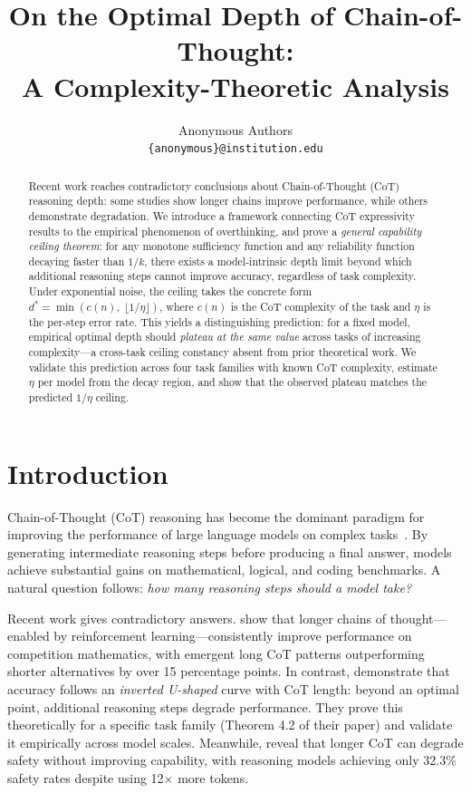 \documentclass{article}
\title{On the Optimal Depth of Chain-of-Thought:\\A Complexity-Theoretic Analysis}
\author{Anonymous Authors \\
  \texttt{\{anonymous\}@institution.edu}
}
\theoremstyle{definition}
\theoremstyle{remark}
\newcommand{\depth}{d^*}       %
\newcommand{\noise}{\eta}      %
\newcommand{\ccot}{c}          %
\begin{document}
\maketitle

\begin{abstract}
Recent work reaches contradictory conclusions about Chain-of-Thought (CoT) reasoning depth: some studies show longer chains improve performance, while others demonstrate degradation.
We introduce a framework connecting CoT expressivity results to the empirical phenomenon of overthinking, and prove a \emph{general capability ceiling theorem}: for any monotone sufficiency function and any reliability function decaying faster than $1/k$, there exists a model-intrinsic depth limit beyond which additional reasoning steps cannot improve accuracy, regardless of task complexity.
Under exponential noise, the ceiling takes the concrete form $\depth = \min(\ccot(n),\; \lfloor 1/\noise \rfloor)$, where $\ccot(n)$ is the CoT complexity of the task and $\noise$ is the per-step error rate.
This yields a distinguishing prediction: for a fixed model, empirical optimal depth should \emph{plateau at the same value} across tasks of increasing complexity---a cross-task ceiling constancy absent from prior theoretical work.
We validate this prediction across four task families with known CoT complexity, estimate $\noise$ per model from the decay region, and show that the observed plateau matches the predicted $1/\noise$ ceiling.
\end{abstract}

\section{Introduction}
\label{sec:intro}

Chain-of-Thought (CoT) reasoning has become the dominant paradigm for improving the performance of large language models on complex tasks~\cite{wei2022chain,kojima2022large}. By generating intermediate reasoning steps before producing a final answer, models achieve substantial gains on mathematical, logical, and coding benchmarks. A natural question follows: \emph{how many reasoning steps should a model take?}

Recent work gives contradictory answers. \citet{yeo2025demystifying} show that longer chains of thought---enabled by reinforcement learning---consistently improve performance on competition mathematics, with emergent long CoT patterns outperforming shorter alternatives by over 15 percentage points. In contrast, \citet{wu2025when} demonstrate that accuracy follows an \emph{inverted U-shaped} curve with CoT length: beyond an optimal point, additional reasoning steps degrade performance. They prove this theoretically for a specific task family (Theorem 4.2 of their paper) and validate it empirically across model scales. Meanwhile, \citet{jiang2025safechain} reveal that longer CoT can degrade safety without improving capability, with reasoning models achieving only 32.3\% safety rates despite using 12$\times$ more tokens.
\end{document}
